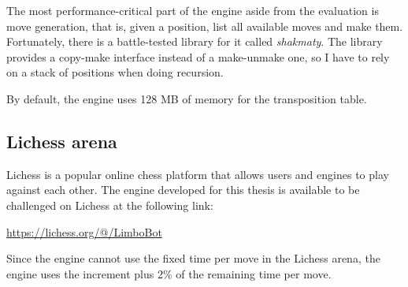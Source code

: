 The most performance-critical part of the engine aside from the evaluation is move generation, that is, given a position, list all available moves and make them.
Fortunately, there is a battle-tested library for it called \textit{shakmaty}. The library provides a copy-make interface instead of a make-unmake one, so I have to rely on a stack of positions when doing recursion.

By default, the engine uses 128 MB of memory for the transposition table.

\subsection{Lichess arena}

Lichess is a popular online chess platform that allows users and engines to play against each other. The engine developed for this thesis is available to be challenged on Lichess at the following link:

\begin{center}
\url{https://lichess.org/@/LimboBot}
\end{center}

Since the engine cannot use the fixed time per move in the Lichess arena, the engine uses the increment plus 2\% of the remaining time per move.

